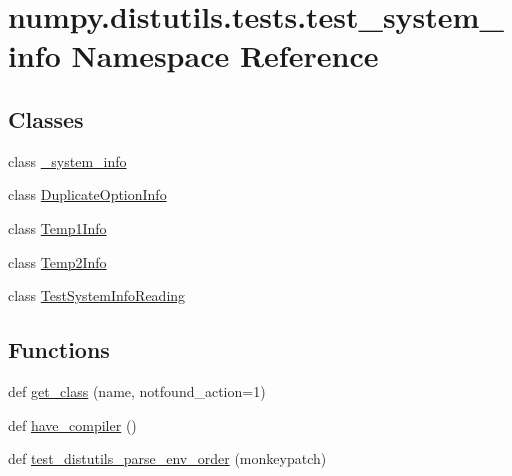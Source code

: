 \hypertarget{namespacenumpy_1_1distutils_1_1tests_1_1test__system__info}{}\section{numpy.\+distutils.\+tests.\+test\+\_\+system\+\_\+info Namespace Reference}
\label{namespacenumpy_1_1distutils_1_1tests_1_1test__system__info}
\subsection*{Classes}
\begin{DoxyCompactItemize}
\item 
class \hyperlink{classnumpy_1_1distutils_1_1tests_1_1test__system__info_1_1__system__info}{\+\_\+system\+\_\+info}
\item 
class \hyperlink{classnumpy_1_1distutils_1_1tests_1_1test__system__info_1_1DuplicateOptionInfo}{Duplicate\+Option\+Info}
\item 
class \hyperlink{classnumpy_1_1distutils_1_1tests_1_1test__system__info_1_1Temp1Info}{Temp1\+Info}
\item 
class \hyperlink{classnumpy_1_1distutils_1_1tests_1_1test__system__info_1_1Temp2Info}{Temp2\+Info}
\item 
class \hyperlink{classnumpy_1_1distutils_1_1tests_1_1test__system__info_1_1TestSystemInfoReading}{Test\+System\+Info\+Reading}
\end{DoxyCompactItemize}
\subsection*{Functions}
\begin{DoxyCompactItemize}
\item 
def \hyperlink{namespacenumpy_1_1distutils_1_1tests_1_1test__system__info_a9678e9a6bdb1844d5f271e085614ffe4}{get\+\_\+class} (name, notfound\+\_\+action=1)
\item 
def \hyperlink{namespacenumpy_1_1distutils_1_1tests_1_1test__system__info_a47fa3dc3da4b31c9209197007c08d843}{have\+\_\+compiler} ()
\item 
def \hyperlink{namespacenumpy_1_1distutils_1_1tests_1_1test__system__info_aedb8102caeaa020be22f99955bf8c98e}{test\+\_\+distutils\+\_\+parse\+\_\+env\+\_\+order} (monkeypatch)
\end{DoxyCompactItemize}
